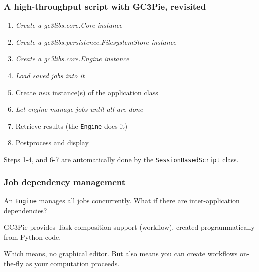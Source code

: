 \documentclass[english,serif,mathserif,xcolor=pdftex,dvipsnames,table]{beamer}
\begin{document}
\begin{frame}
  \frametitle{A high-throughput script with GC3Pie, revisited}

  \begin{enumerate}
  \item \emph{Create a gc3libs.core.Core instance}
  \item \emph{Create a gc3libs.persistence.FilesystemStore instance}
  \item \emph{Create a gc3libs.core.Engine instance}
  \item \emph{Load saved jobs into it}
  \item Create \emph{new} instance(s) of the application class
  \item \emph{Let engine manage jobs until all are done}
  \item \sout{Retrieve results} (the \texttt{Engine} does it)
  \item Postprocess and display
  \end{enumerate}

  Steps 1-4, and 6-7 are automatically done by the
  \texttt{SessionBasedScript} class.
\end{frame}

\begin{frame}
\frametitle{Job dependency management}
  \begin{block}{}
  An \texttt{Engine} manages all jobs concurrently.
  What if there are inter-application dependencies?
  \end{block}

  \begin{block}{}
  GC3Pie provides {\color{Blue}Task composition} support (workflow), created
  programmatically from Python code.
  \end{block}

  \begin{block}{}
  Which means, no graphical editor.  But also means you can create
  workflows {\color{Blue}on-the-fly} as your computation proceeds.
  \end{block}
\end{frame}
\end{document}
